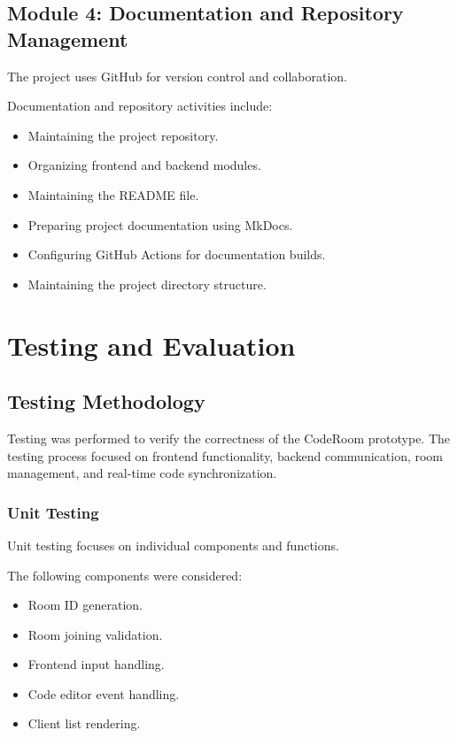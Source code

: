 \documentclass[12pt,a4paper,oneside]{report}
\begin{document}
\section{Module 4: Documentation and Repository Management}

The project uses GitHub for version control and collaboration.

Documentation and repository activities include:

\begin{itemize}
    \item Maintaining the project repository.
    \item Organizing frontend and backend modules.
    \item Maintaining the README file.
    \item Preparing project documentation using MkDocs.
    \item Configuring GitHub Actions for documentation builds.
    \item Maintaining the project directory structure.
\end{itemize}

\chapter{Testing and Evaluation}

\section{Testing Methodology}

Testing was performed to verify the correctness of the CodeRoom prototype. The testing process focused on frontend functionality, backend communication, room management, and real-time code synchronization.

\subsection{Unit Testing}

Unit testing focuses on individual components and functions.

The following components were considered:

\begin{itemize}
    \item Room ID generation.
    \item Room joining validation.
    \item Frontend input handling.
    \item Code editor event handling.
    \item Client list rendering.
\end{itemize}
\end{document}
